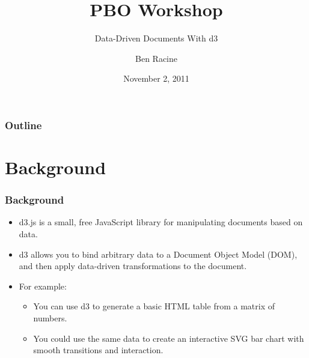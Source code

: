 \documentclass{beamer}
\title{PBO Workshop}
\subtitle{Data-Driven Documents With d3}
\author{Ben Racine \inst{1} }
\institute{\inst{1} Cornerstone Systems NW }
\date{November 2, 2011}
\begin{document}
\begin{frame}
    \frametitle{}
    \titlepage
\end{frame}


 \begin{frame}
    \scriptsize{
        \frametitle{Outline}
        \tableofcontents[pausesections]
    }
 \end{frame}



\section{Background}



\begin{frame}
\frametitle{Background}
\begin{itemize}
\item d3.js is a small, free JavaScript library for manipulating documents based on data.
\item d3 allows you to bind arbitrary data to a Document Object Model (DOM), and then apply data-driven transformations to the document. 
\item For example:
    \begin{itemize}
    \item You can use d3 to generate a basic HTML table from a matrix of numbers.
    \item You could use the same data to create an interactive SVG bar chart with smooth transitions and interaction.
    \end{itemize}
\end{itemize}
\end{frame}
\end{document}
